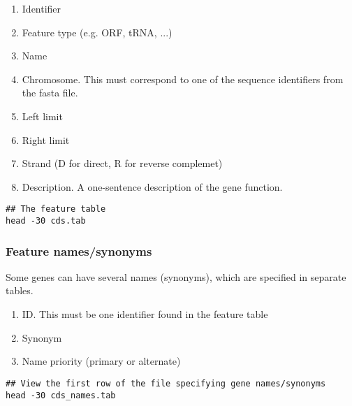 \begin{enumerate}

\item Identifier

\item Feature type (e.g. ORF, tRNA, ...)

\item Name

\item Chromosome. This must correspond to one of the sequence
identifiers from the fasta file.

\item Left limit

\item Right limit

\item Strand (D for direct, R for reverse complemet)

\item Description. A one-sentence description of the gene function.

\end{enumerate}


\begin{footnotesize}
\begin{verbatim}
## The feature table
head -30 cds.tab
\end{verbatim}
\end{footnotesize}


\subsubsection{Feature names/synonyms}

Some genes can have several names (synonyms), which are specified in
separate tables.

\begin{enumerate}
\item ID. This must be one identifier found in the feature table
\item Synonym
\item Name priority (primary or alternate)
\end{enumerate}


\begin{footnotesize}
\begin{verbatim}
## View the first row of the file specifying gene names/synonyms
head -30 cds_names.tab
\end{verbatim}
\end{footnotesize}


